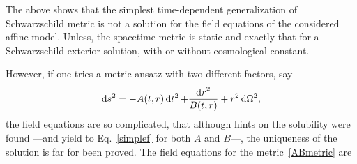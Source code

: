 The above shows that the simplest time-dependent generalization of Schwarzschild metric is not a solution for the field equations of the considered affine model. Unless, the spacetime metric is static and exactly that for a Schwarzschild exterior solution, with or without cosmological constant.

However, if one tries a metric ansatz with two different factors, say
\begin{equation}
  \mathop{\mathrm{d}s}\nolimits^2 = - A(t,r) \mathop{\mathrm{d}t}\nolimits^2 + \frac{ \mathop{\mathrm{d}r}\nolimits^2 }{ B(t,r) } + r^2 \mathop{\mathrm{d}\Omega}\nolimits^2,
  \label{ABmetric}
\end{equation}
the field equations are so complicated, that although hints on the solubility were found ---and yield to Eq.~\eqref{simplef} for both $A$ and $B$---, the uniqueness of the solution is far for been proved. The field equations for the metric~\eqref{ABmetric} are %
